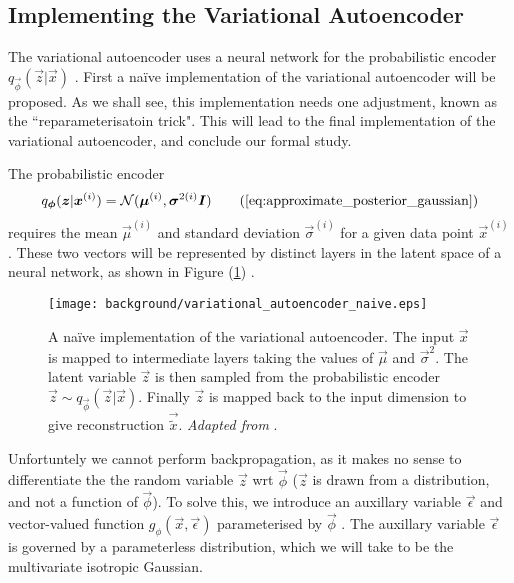 \subsection{Implementing the Variational Autoencoder}

The variational autoencoder uses a neural network for the probabilistic encoder $q_{\vec{\phi}}(\vec{z}|\vec{x})$ \cite{Kingma2014}. First a na\"{i}ve implementation of the variational autoencoder will be proposed. As we shall see, this implementation needs one adjustment, known as the ``reparameterisatoin trick". This will lead to the final implementation of the variational autoencoder, and conclude our formal study.

The probabilistic encoder
\begin{align}
q_{\vec{\phi}}(\vec{z} | \vec{x}^{(i)}) = \mathcal{N}(\vec{\mu}^{(i)}, \vec{\sigma}^{2(i)}\vec{I})
\tag{\ref{eq:approximate_posterior_gaussian}}
\end{align}
requires the mean $\vec{\mu}^{(i)}$ and standard deviation $\vec{\sigma}^{(i)}$ for a given data point $\vec{x}^{(i)}$. These two vectors will be represented by distinct layers in the latent space of a neural network, as shown in Figure (\ref{fig:variational_autoencoder_naive}) \cite{Li2016}.\\

\begin{figure}[h!]
\centering
\captionsetup{justification=centering}
\texttt{[image: background/variational\_autoencoder\_naive.eps]}
\caption{A na\"{i}ve implementation of the variational autoencoder. The input $\vec{x}$ is mapped to intermediate layers taking the values of $\vec{\mu}$ and $\vec{\sigma}^2$. The latent variable $\vec{z}$ is then sampled from the probabilistic encoder $\vec{z} \sim q_{\vec{\phi}}(\vec{z} | \vec{x})$. Finally $\vec{z}$ is mapped back to the input dimension to give reconstruction $\vec{\tilde{x}}$. \textit{Adapted from} \cite{Li2016}.}
\label{fig:variational_autoencoder_naive}
\end{figure}

Unfortuntely we cannot perform backpropagation, as it makes no sense to differentiate the the random variable $\vec{z}$ wrt $\vec{\phi}$ ($\vec{z}$ is drawn from a distribution, and not a function of $\vec{\phi}$). To solve this, we introduce an auxillary variable $\vec{\epsilon}$ and vector-valued function $g_{\phi}(\vec{x}, \vec{\epsilon})$ parameterised by $\vec{\phi}$ \cite{Kingma2014}. The auxillary variable $\vec{\epsilon}$ is governed by a parameterless distribution, which we will take to be the multivariate isotropic Gaussian.

